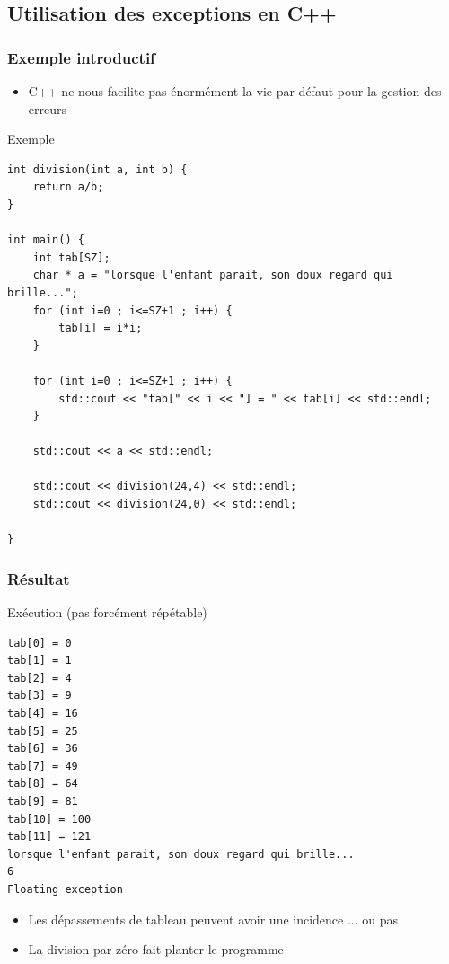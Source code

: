 \subsection{Utilisation des exceptions en C++}

\begin{frame}[fragile]
\frametitle{Exemple introductif}
\begin{itemize}
\item C++ ne nous facilite pas énormément la vie par défaut pour la gestion des erreurs 
\end{itemize}
\begin{codeblock}{Exemple}
\begin{lstlisting}
int division(int a, int b) {
    return a/b;
}

int main() {
    int tab[SZ];
    char * a = "lorsque l'enfant parait, son doux regard qui brille...";
    for (int i=0 ; i<=SZ+1 ; i++) {
        tab[i] = i*i;
    }
    
    for (int i=0 ; i<=SZ+1 ; i++) {
        std::cout << "tab[" << i << "] = " << tab[i] << std::endl;
    }
    
    std::cout << a << std::endl;
    
    std::cout << division(24,4) << std::endl;
    std::cout << division(24,0) << std::endl;
    
}
\end{lstlisting}
\end{codeblock}
\end{frame}

\begin{frame}[fragile]
\frametitle{Résultat}
\begin{block}{Exécution (pas forcément répétable)}
{\tiny 
\begin{verbatim}
tab[0] = 0
tab[1] = 1
tab[2] = 4
tab[3] = 9
tab[4] = 16
tab[5] = 25
tab[6] = 36
tab[7] = 49
tab[8] = 64
tab[9] = 81
tab[10] = 100
tab[11] = 121
lorsque l'enfant parait, son doux regard qui brille...
6
Floating exception
\end{verbatim}
}
\end{block}
\begin{itemize}
\item Les dépassements de tableau peuvent avoir une incidence ... ou pas
\item La division par zéro fait planter le programme
\end{itemize}
\end{frame}

